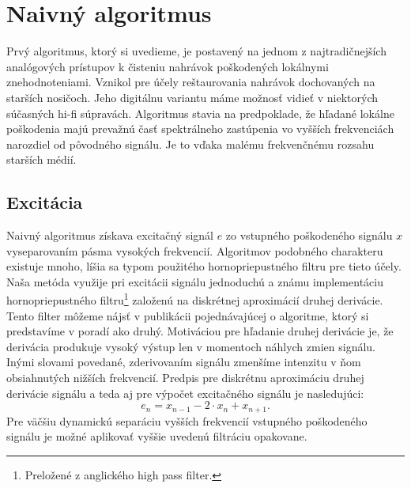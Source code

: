 \section{Naivný algoritmus}
Prvý algoritmus, ktorý si uvedieme, je postavený na jednom z najtradičnejších analógových prístupov k čisteniu nahrávok poškodených lokálnymi znehodnoteniami. Vznikol pre účely reštaurovania nahrávok dochovaných na starších nosičoch. Jeho digitálnu variantu máme možnosť vidieť v niektorých súčasných hi-fi súpravách. Algoritmus stavia na predpoklade, že hľadané lokálne poškodenia majú prevažnú časť spektrálneho zastúpenia vo vyšších frekvenciách narozdiel od pôvodného signálu. Je to vďaka malému frekvenčnému rozsahu starších médií.

\subsection{Excitácia}
Naivný algoritmus získava excitačný signál $e$ zo vstupného poškodeného signálu $x$ vyseparovaním pásma vysokých frekvencií. Algoritmov podobného charakteru existuje mnoho, líšia sa typom použitého hornopriepustného filtru pre tieto účely. Naša metóda využije pri excitácii signálu jednoduchú a známu implementáciu hornopriepustného filtru\footnote{Preložené z anglického high pass filter.} založenú na diskrétnej aproximácií druhej derivácie. Tento filter môžeme nájsť v publikácii \cite{Kasparis} pojednávajúcej o algoritme, ktorý si predstavíme v poradí ako druhý. Motiváciou pre hľadanie druhej derivácie je, že derivácia produkuje vysoký výstup len v momentoch náhlych zmien signálu. Inými slovami povedané, zderivovaním signálu zmenšíme intenzitu v ňom obsiahnutých nižších frekvencií. Predpis pre diskrétnu aproximáciu druhej derivácie signálu a teda aj pre výpočet excitačného signálu je nasledujúci: 
$$e_n = x_{n-1} - 2 \cdot x_n + x_{n+1}.$$
Pre väčšiu dynamickú separáciu vyšších frekvencií vstupného poškodeného signálu je možné aplikovať vyššie uvedenú filtráciu opakovane.

